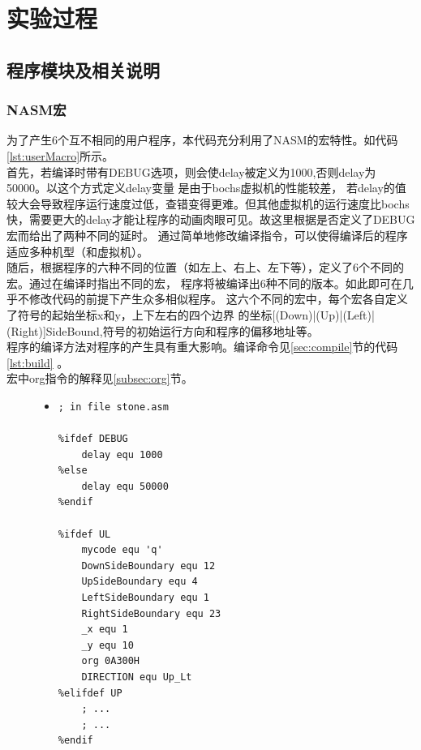 \documentclass[a4paper]{article}
\newcommand{\codev}[1]{\textsf{#1}}
\begin{document}
\section{实验过程}
    \subsection{程序模块及相关说明}\label{subsec:modelIntroduction}
    \subsubsection{NASM宏} \label{subsec:NASMmacro}
    为了产生6个互不相同的用户程序，本代码充分利用了NASM的宏特性。如代码\ref{lst:userMacro}所示。\\
    
    首先，若编译时带有\codev{DEBUG}选项，则会使delay被定义为1000,否则delay为50000。以这个方式定义delay变量
    是由于bochs虚拟机的性能较差，
    若delay的值较大会导致程序运行速度过低，查错变得更难。但其他虚拟机的运行速度比bochs
    快，需要更大的delay才能让程序的动画肉眼可见。故这里根据是否定义了\codev{DEBUG}宏而给出了两种不同的延时。
    通过简单地修改编译指令，可以使得编译后的程序适应多种机型（和虚拟机）。\\
    
    随后，根据程序的六种不同的位置（如左上、右上、左下等），定义了6个不同的宏。通过在编译时指出不同的宏，
    程序将被编译出6种不同的版本。如此即可在几乎不修改代码的前提下产生众多相似程序。
    这六个不同的宏中，每个宏各自定义了符号的起始坐标\codev{x}和\codev{y}，上下左右的四个边界
    的坐标\codev{[(Down)|(Up)|(Left)|(Right)]SideBound},符号的初始运行方向和程序的偏移地址等。\\
    

    程序的编译方法对程序的产生具有重大影响。编译命令见\ref{sec:compile}节的代码\ref{lst:build}
    。\\
    
    宏中\codev{org}指令的解释见\ref{subsec:org}节。
    
    \begin{figure}
    \begin{itemize}
    \item[] \begin{lstlisting}[language={[x86masm]Assembler}, label=lst:userMacro, caption=用户程序中的部分宏代码]
; in file stone.asm 

%ifdef DEBUG
    delay equ 1000
%else
    delay equ 50000
%endif

%ifdef UL
    mycode equ 'q'
    DownSideBoundary equ 12
    UpSideBoundary equ 4
    LeftSideBoundary equ 1
    RightSideBoundary equ 23
    _x equ 1
    _y equ 10
    org 0A300H
    DIRECTION equ Up_Lt
%elifdef UP
    ; ...
    ; ...
%endif
    \end{lstlisting}
    \end{itemize}
    \end{figure}
   
\end{document}
